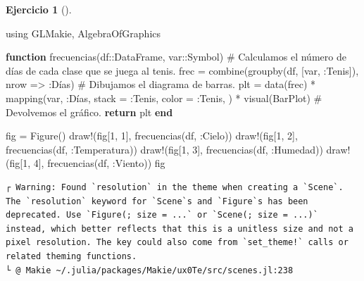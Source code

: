 \documentclass[
  a4paper,
]{scrreport}
\newenvironment{Shaded}{\begin{snugshade}}{\end{snugshade}}
\newcommand{\BuiltInTok}[1]{\textcolor[rgb]{0.00,0.23,0.31}{#1}}
\newcommand{\CommentTok}[1]{\textcolor[rgb]{0.37,0.37,0.37}{#1}}
\newcommand{\ControlFlowTok}[1]{\textcolor[rgb]{0.00,0.23,0.31}{\textbf{#1}}}
\newcommand{\DataTypeTok}[1]{\textcolor[rgb]{0.68,0.00,0.00}{#1}}
\newcommand{\FloatTok}[1]{\textcolor[rgb]{0.68,0.00,0.00}{#1}}
\newcommand{\FunctionTok}[1]{\textcolor[rgb]{0.28,0.35,0.67}{#1}}
\newcommand{\ImportTok}[1]{\textcolor[rgb]{0.00,0.46,0.62}{#1}}
\newcommand{\KeywordTok}[1]{\textcolor[rgb]{0.00,0.23,0.31}{\textbf{#1}}}
\newcommand{\NormalTok}[1]{\textcolor[rgb]{0.00,0.23,0.31}{#1}}
\newcommand{\OperatorTok}[1]{\textcolor[rgb]{0.37,0.37,0.37}{#1}}
\theoremstyle{definition}
\newtheorem{exercise}{Ejercicio}[chapter]
\theoremstyle{remark}
\begin{document}
\begin{exercise}[]
\begin{enumerate}
\begin{tcolorbox}
\begin{Shaded}
\begin{Highlighting}[]
\ImportTok{using} \BuiltInTok{GLMakie}\NormalTok{, }\BuiltInTok{AlgebraOfGraphics}

\KeywordTok{function} \FunctionTok{frecuencias}\NormalTok{(df}\OperatorTok{::}\DataTypeTok{DataFrame}\NormalTok{, var}\OperatorTok{::}\DataTypeTok{Symbol}\NormalTok{)}
    \CommentTok{\# Calculamos el número de días de cada clase que se juega al tenis.}
\NormalTok{    frec }\OperatorTok{=} \FunctionTok{combine}\NormalTok{(}\FunctionTok{groupby}\NormalTok{(df, [var, }\OperatorTok{:}\NormalTok{Tenis]), nrow }\OperatorTok{=\textgreater{}} \OperatorTok{:}\NormalTok{Días)}
    \CommentTok{\# Dibujamos el diagrama de barras.}
\NormalTok{    plt }\OperatorTok{=} \FunctionTok{data}\NormalTok{(frec) }\OperatorTok{*} 
    \FunctionTok{mapping}\NormalTok{(var, }\OperatorTok{:}\NormalTok{Días, stack }\OperatorTok{=} \OperatorTok{:}\NormalTok{Tenis, color }\OperatorTok{=} \OperatorTok{:}\NormalTok{Tenis, ) }\OperatorTok{*} 
    \FunctionTok{visual}\NormalTok{(BarPlot) }
    \CommentTok{\# Devolvemos el gráfico.}
    \ControlFlowTok{return}\NormalTok{ plt}
\KeywordTok{end}

\NormalTok{fig }\OperatorTok{=} \FunctionTok{Figure}\NormalTok{()}
\FunctionTok{draw!}\NormalTok{(fig[}\FloatTok{1}\NormalTok{, }\FloatTok{1}\NormalTok{], }\FunctionTok{frecuencias}\NormalTok{(df, }\OperatorTok{:}\NormalTok{Cielo))}
\FunctionTok{draw!}\NormalTok{(fig[}\FloatTok{1}\NormalTok{, }\FloatTok{2}\NormalTok{], }\FunctionTok{frecuencias}\NormalTok{(df, }\OperatorTok{:}\NormalTok{Temperatura))}
\FunctionTok{draw!}\NormalTok{(fig[}\FloatTok{1}\NormalTok{, }\FloatTok{3}\NormalTok{], }\FunctionTok{frecuencias}\NormalTok{(df, }\OperatorTok{:}\NormalTok{Humedad))}
\FunctionTok{draw!}\NormalTok{(fig[}\FloatTok{1}\NormalTok{, }\FloatTok{4}\NormalTok{], }\FunctionTok{frecuencias}\NormalTok{(df, }\OperatorTok{:}\NormalTok{Viento))}
\NormalTok{fig}
\end{Highlighting}
\end{Shaded}

\begin{verbatim}
┌ Warning: Found `resolution` in the theme when creating a `Scene`. The `resolution` keyword for `Scene`s and `Figure`s has been deprecated. Use `Figure(; size = ...` or `Scene(; size = ...)` instead, which better reflects that this is a unitless size and not a pixel resolution. The key could also come from `set_theme!` calls or related theming functions.
└ @ Makie ~/.julia/packages/Makie/ux0Te/src/scenes.jl:238
\end{verbatim}


\end{tcolorbox}
\end{enumerate}
\end{exercise}
\end{document}
